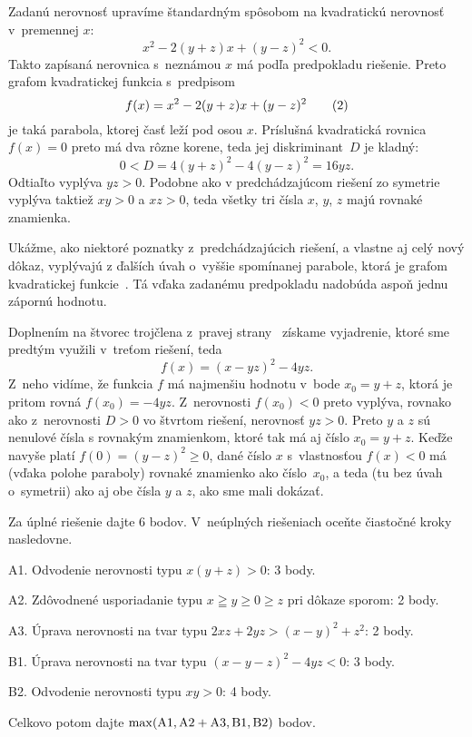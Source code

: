 {\ineriesenie
Zadanú nerovnosť upravíme štandardným spôsobom na kvadratickú
nerovnosť v~premennej $x$:
$$
x^2-2(y+z)x+(y-z)^2<0.
$$
Takto zapísaná nerovnica s~neznámou $x$
má podľa predpokladu riešenie. Preto grafom kvadratickej
funkcia s~predpisom
$$
f(x)=x^2-2(y+z)x+(y-z)^2
\tag2
$$
je taká parabola, ktorej časť leží pod osou $x$. Príslušná
kvadratická rovnica $f(x)=0$ preto má dva rôzne korene, teda
jej diskriminant~$D$ je kladný:
$$
0<D=4(y+z)^2-4(y-z)^2=16yz.
$$
Odtiaľto vyplýva $yz>0$. Podobne ako v predchádzajúcom riešení
zo symetrie vyplýva taktiež $xy>0$ a $xz>0$, teda všetky tri čísla
$x$, $y$, $z$ majú rovnaké znamienka.

\poznamka
Ukážme, ako niektoré poznatky z~predchádzajúcich riešení, a
vlastne aj celý nový dôkaz, vyplývajú z ďalších úvah
o~vyššie spomínanej parabole, ktorá je grafom kvadratickej funkcie~.
Tá vďaka zadanému predpokladu nadobúda aspoň jednu zápornú hodnotu.

Doplnením na štvorec trojčlena z~pravej strany~
získame vyjadrenie, ktoré sme predtým využili v~treťom riešení,
teda
$$
f(x)=(x-yz)^2-4yz.
$$
Z~neho vidíme, že funkcia $f$ má
najmenšiu hodnotu v~bode $x_0=y+z$, ktorá je pritom rovná
$f(x_0)={-4yz}$. Z~nerovnosti $f(x_0)<0$ preto
vyplýva, rovnako ako z~nerovnosti $D>0$ vo štvrtom riešení,
nerovnosť $yz>0$. Preto $y$ a $z$ sú nenulové čísla
s rovnakým znamienkom, ktoré tak má aj číslo $x_0=y+z$.
Keďže navyše platí $f(0)=(y-z)^2\geq0$,
dané číslo $x$ s~vlastnosťou $f(x)<0$ má (vďaka polohe
paraboly) rovnaké znamienko ako číslo~$x_0$,
a teda (tu bez úvah o~symetrii)
ako aj obe čísla $y$ a $z$, ako sme mali dokázať.


\schemaABC
Za úplné riešenie dajte 6 bodov. V~neúplných riešeniach oceňte
čiastočné kroky nasledovne.

\smallskip
\item{A1.} Odvodenie nerovnosti typu $x(y+z)>0$: 3 body.
\item{A2.} Zdôvodnené usporiadanie typu $x\geqq y\geq0\geq z$ pri dôkaze sporom: 2 body.
\item{A3.} Úprava nerovnosti na tvar typu $2xz+2yz>(x-y)^2+z^2$: 2 body.
\item{B1.} Úprava nerovnosti na tvar typu $(x-y-z)^2-4yz<0$: 3 body.
\item{B2.} Odvodenie nerovnosti typu $xy>0$: 4 body.

\smallskip\noindent
Celkovo potom dajte
$\rm\max(A1,A2+A3,B1,B2)$ bodov.
\endschema
}

